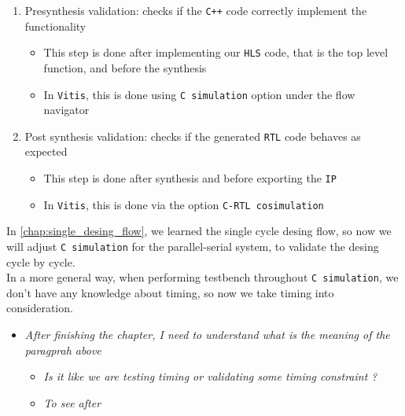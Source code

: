 \begin{enumerate}

\item Presynthesis validation: checks if the \verb|C++| code correctly implement the functionality

	\begin{itemize}
	\item This step is done after implementing our \verb|HLS| code, that is the top level function, and before the synthesis 
	
	\item In \verb|Vitis|, this is done using \verb|C simulation| option under the flow navigator	
	
	\end{itemize}

\item Post synthesis validation: checks if the generated \verb|RTL| code behaves as expected

	\begin{itemize}
	\item This step is done after synthesis and before exporting the \verb|IP|
	
	
	\item In \verb|Vitis|, this is done via the option \verb|C-RTL cosimulation|
	\end{itemize}

\end{enumerate}


In \autoref{chap:single_desing_flow}, we learned the single cycle desing flow, so now we will adjust \verb|C simulation| for the parallel-serial system, to validate the desing cycle by cycle.\\

In a more general way, when performing testbench throughout \verb|C simulation|, we don't have any knowledge about timing, so now we take timing into consideration.


 

\begin{itemize}

\item \textit{After finishing the chapter, I need to understand what is the meaning of the paragprah above}

	\begin{itemize}
	\item \textit{Is it like we are testing timing or validating some timing constraint ?}
	
	\item \textit{To see after}	
	
	\end{itemize}

\end{itemize}


